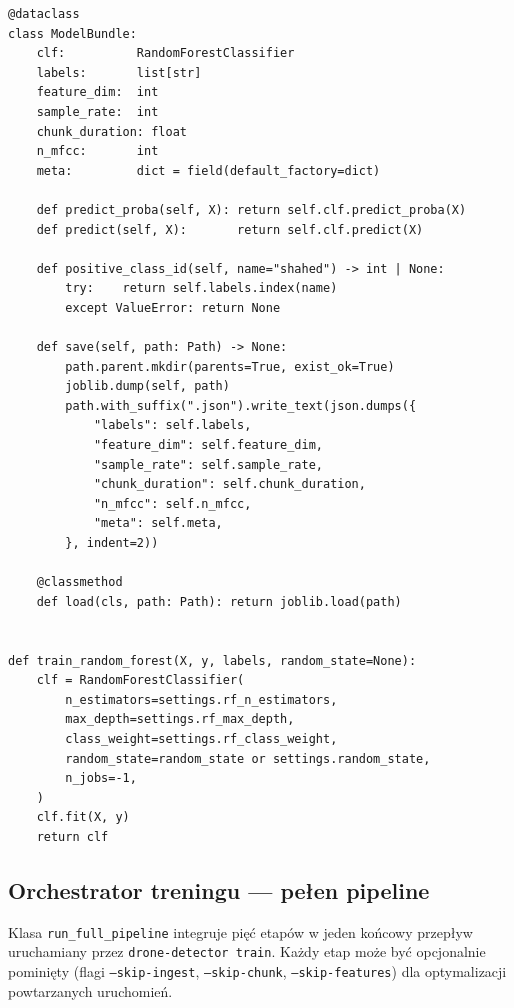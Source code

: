 \documentclass[11pt,a4paper]{article}
\begin{document}
\begin{lstlisting}[caption={Bundle modelu (\texttt{models/baseline.py}).},label={lst:bundle}]
@dataclass
class ModelBundle:
    clf:          RandomForestClassifier
    labels:       list[str]
    feature_dim:  int
    sample_rate:  int
    chunk_duration: float
    n_mfcc:       int
    meta:         dict = field(default_factory=dict)

    def predict_proba(self, X): return self.clf.predict_proba(X)
    def predict(self, X):       return self.clf.predict(X)

    def positive_class_id(self, name="shahed") -> int | None:
        try:    return self.labels.index(name)
        except ValueError: return None

    def save(self, path: Path) -> None:
        path.parent.mkdir(parents=True, exist_ok=True)
        joblib.dump(self, path)
        path.with_suffix(".json").write_text(json.dumps({
            "labels": self.labels,
            "feature_dim": self.feature_dim,
            "sample_rate": self.sample_rate,
            "chunk_duration": self.chunk_duration,
            "n_mfcc": self.n_mfcc,
            "meta": self.meta,
        }, indent=2))

    @classmethod
    def load(cls, path: Path): return joblib.load(path)


def train_random_forest(X, y, labels, random_state=None):
    clf = RandomForestClassifier(
        n_estimators=settings.rf_n_estimators,
        max_depth=settings.rf_max_depth,
        class_weight=settings.rf_class_weight,
        random_state=random_state or settings.random_state,
        n_jobs=-1,
    )
    clf.fit(X, y)
    return clf
\end{lstlisting}

\subsection{Orchestrator treningu --- pełen pipeline}

Klasa \texttt{run\_full\_pipeline} integruje pięć etapów w jeden końcowy
przepływ uruchamiany przez \texttt{drone-detector train}. Każdy etap może być
opcjonalnie pominięty (flagi \texttt{--skip-ingest}, \texttt{--skip-chunk},
\texttt{--skip-features}) dla optymalizacji powtarzanych uruchomień.
\end{document}
